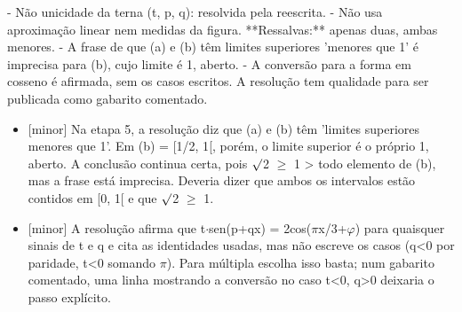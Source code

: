 \documentclass{article}%
\begin{document}
{-} Não unicidade da terna (t, p, q): resolvida pela reescrita.\newline%
{-} Não usa aproximação linear nem medidas da figura.\newline%
\newline%
**Ressalvas:** apenas duas, ambas menores.\newline%
{-} A frase de que (a) e (b) têm limites superiores 'menores que 1' é imprecisa para (b), cujo limite é 1, aberto.\newline%
{-} A conversão para a forma em cosseno é afirmada, sem os casos escritos.\newline%
\newline%
A resolução tem qualidade para ser publicada como gabarito comentado.%
\begin{itemize}%
\item%
{[}minor{]} Na etapa 5, a resolução diz que (a) e (b) têm 'limites superiores menores que 1'. Em (b) = {[}1/2, 1{[}, porém, o limite superior é o próprio 1, aberto. A conclusão continua certa, pois $\surd$2 $\geq$ 1 > todo elemento de (b), mas a frase está imprecisa. Deveria dizer que ambos os intervalos estão contidos em {[}0, 1{[} e que $\surd$2 $\geq$ 1.%
\item%
{[}minor{]} A resolução afirma que t$\cdot$sen(p+qx) = 2cos($\pi$x/3+$\varphi$) para quaisquer sinais de t e q e cita as identidades usadas, mas não escreve os casos (q<0 por paridade, t<0 somando $\pi$). Para múltipla escolha isso basta; num gabarito comentado, uma linha mostrando a conversão no caso t<0, q>0 deixaria o passo explícito.%
\end{itemize}%
\end{document}
